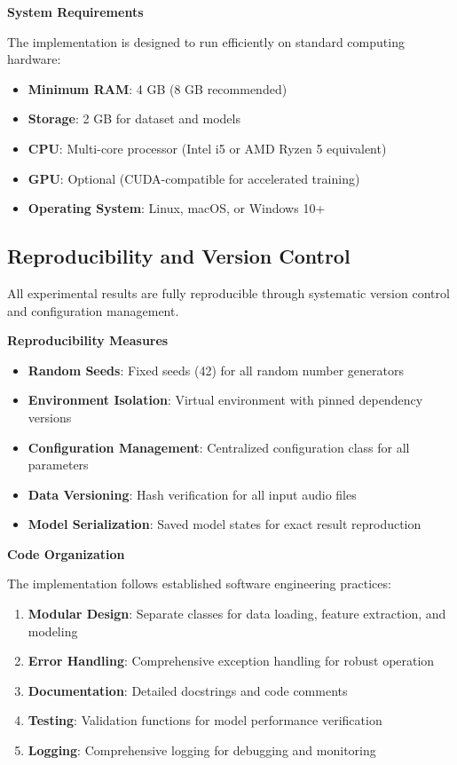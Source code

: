 \documentclass[12pt,a4paper]{article}
\begin{document}
\textbf{System Requirements}

The implementation is designed to run efficiently on standard computing hardware:

\begin{itemize}
\item \textbf{Minimum RAM}: 4 GB (8 GB recommended)
\item \textbf{Storage}: 2 GB for dataset and models
\item \textbf{CPU}: Multi-core processor (Intel i5 or AMD Ryzen 5 equivalent)
\item \textbf{GPU}: Optional (CUDA-compatible for accelerated training)
\item \textbf{Operating System}: Linux, macOS, or Windows 10+
\end{itemize}

\subsection{Reproducibility and Version Control}

All experimental results are fully reproducible through systematic version control and configuration management.

\textbf{Reproducibility Measures}

\begin{itemize}
\item \textbf{Random Seeds}: Fixed seeds (42) for all random number generators
\item \textbf{Environment Isolation}: Virtual environment with pinned dependency versions
\item \textbf{Configuration Management}: Centralized configuration class for all parameters
\item \textbf{Data Versioning}: Hash verification for all input audio files
\item \textbf{Model Serialization}: Saved model states for exact result reproduction
\end{itemize}

\textbf{Code Organization}

The implementation follows established software engineering practices:

\begin{enumerate}
\item \textbf{Modular Design}: Separate classes for data loading, feature extraction, and modeling
\item \textbf{Error Handling}: Comprehensive exception handling for robust operation
\item \textbf{Documentation}: Detailed docstrings and code comments
\item \textbf{Testing}: Validation functions for model performance verification
\item \textbf{Logging}: Comprehensive logging for debugging and monitoring
\end{enumerate}
\end{document}
